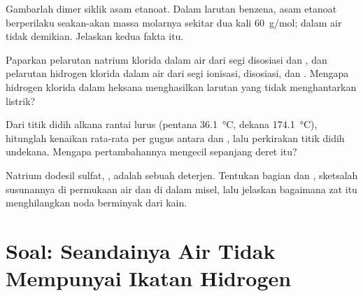 \begin{exercise}[$\star\star$]\label{exo:b1:intermolecular-forces-solvents:9}
Gambarlah dimer siklik asam etanoat. Dalam larutan benzena, asam etanoat
berperilaku seakan-akan massa molarnya sekitar dua kali \qty{60}{g/mol};
dalam air tidak demikian. Jelaskan kedua fakta itu.
\end{exercise}

\begin{exercise}[$\star\star\star$]\label{exo:b1:intermolecular-forces-solvents:10}
Paparkan pelarutan natrium klorida dalam air dari segi disosiasi dan
, dan pelarutan hidrogen klorida dalam air dari segi ionisasi,
disosiasi, dan . Mengapa hidrogen klorida dalam heksana
menghasilkan larutan yang tidak menghantarkan listrik?
\end{exercise}

\begin{exercise}[$\star\star\star$]\label{exo:b1:intermolecular-forces-solvents:11}
Dari titik didih alkana rantai lurus (pentana \qty{36.1}{\celsius},
dekana \qty{174.1}{\celsius}), hitunglah kenaikan rata-rata per gugus
 antara  dan , lalu perkirakan titik didih
undekana. Mengapa pertambahannya mengecil sepanjang deret itu?
\end{exercise}

\begin{exercise}[$\star\star\star$]\label{exo:b1:intermolecular-forces-solvents:12}
Natrium dodesil sulfat, , adalah sebuah
deterjen. Tentukan bagian  dan , sketsalah
susunannya di permukaan air dan di dalam misel, lalu jelaskan bagaimana
zat itu menghilangkan noda berminyak dari kain.
\end{exercise}

\section{Soal: Seandainya Air Tidak Mempunyai Ikatan Hidrogen}


